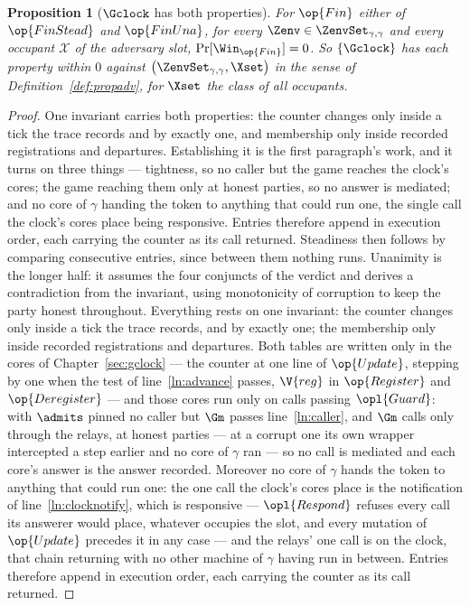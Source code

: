 \documentclass[10pt,oneside,openany]{book}
\theoremstyle{accentdef}
\theoremstyle{accentplain}
\newtheorem{proposition}[definition]{Proposition}
\begin{document}
\begin{proposition}[$\Gclock$ has both properties]\label{prop:clockprops}
For $\op{Fin}$ either of $\op{FinStead}$ and $\op{FinUna}$, for every
$\Zenv \in \ZenvSet_{\gamma,\gamma}$ and every occupant $\mathcal{X}$ of the adversary slot,
$\Pr[\Win_{\op{Fin}}] = 0$. So $\{\Gclock\}$ has each property within $0$ against
$\bigl(\ZenvSet_{\gamma,\gamma},\Xset\bigr)$ in the sense of Definition~\ref{def:propadv}, for
$\Xset$ the class of all occupants.
\end{proposition}

\begin{proof}
One invariant carries both properties: the counter changes only inside a tick the trace records and
by exactly one, and membership only inside recorded registrations and departures. Establishing it is
the first paragraph's work, and it turns on three things --- tightness, so no caller but the game
reaches the clock's cores; the game reaching them only at honest parties, so no answer is mediated;
and no core of $\gamma$ handing the token to anything that could run one, the single call the
clock's cores place being responsive. Entries therefore append in execution order, each carrying the
counter as its call returned. Steadiness then follows by comparing consecutive entries, since
between them nothing runs. Unanimity is the longer half: it assumes the four conjuncts of the
verdict and derives a contradiction from the invariant, using monotonicity of corruption to keep the
party honest throughout.
Everything rests on one invariant: the counter changes only inside a tick the trace records, and
by exactly one; the membership only inside recorded registrations and departures. Both tables are
written only in the cores of Chapter~\ref{sec:gclock} --- the counter at one line of
$\op{Update}$, stepping by one when the test of line~\ref{ln:advance} passes, $\V{reg}$ in
$\op{Register}$ and $\op{Deregister}$ --- and those cores run only on calls passing
$\opl{Guard}$: with $\admits$ pinned no caller but $\Gm$ passes line~\ref{ln:caller}, and $\Gm$
calls only through the relays, at honest parties --- at a corrupt one its own wrapper intercepted
a step earlier and no core of $\gamma$ ran --- so no call is mediated and each core's answer is
the answer recorded. Moreover no core of $\gamma$ hands the token to anything that could run one:
the one call the clock's cores place is the notification of line~\ref{ln:clocknotify}, which is
responsive --- $\opl{Respond}$ refuses every call its answerer would place, whatever occupies the
slot, and every mutation of $\op{Update}$ precedes it in any case --- and the relays' one call is
on the clock, that chain returning with no other machine of $\gamma$ having run in between.
Entries therefore append in execution order, each carrying the counter as its call returned.


\end{proof}
\end{document}
